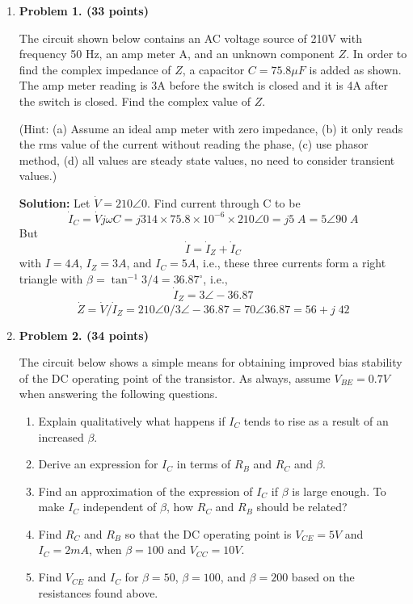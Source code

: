\begin{enumerate}

\item {\bf Problem 1. (33 points)} 

The circuit shown below contains an AC voltage source of 210V with frequency
50 Hz, an amp meter A, and an unknown component $Z$. In order to find the 
complex impedance of $Z$, a capacitor $C=75.8\mu F$ is added as shown. The 
amp meter reading is 3A before the switch is closed and it is 4A after the
switch is closed. Find the complex value of $Z$.

(Hint: (a) Assume an ideal amp meter with zero impedance, (b) it only reads 
the rms value of the current without reading the phase, (c) use phasor method,
(d) all values are steady state values, no need to consider transient values.)


{\bf Solution:}
Let $\dot{V}=210\angle 0$. Find current through C to be
\[ \dot{I}_C=\dot{V} j\omega C=j314\times 75.8\times 10^{-6}\times 210\angle 0
=j5\;A=5\angle 90\;A \]
But
\[ \dot{I}=\dot{I}_Z+\dot{I}_C \]
with $I=4A$, $I_Z=3A$, and $I_C=5A$, i.e., these three currents form a 
right triangle with $\beta=\tan^{-1} 3/4=36.87^\circ$, i.e.,
\[ \dot{I}_Z=3\angle -36.87 \]
\[ \dot{Z}=\dot{V}/\dot{I}_Z=210\angle 0/3\angle -36.87 =70\angle 36.87
=56+j\;42\]



%
%
%

\item {\bf Problem 2. (34 points)} 

The circuit below shows a simple means for obtaining improved bias
stability of the DC operating point of the transistor. As always,
assume $V_{BE}=0.7V$ when answering the following questions.


\begin{enumerate}
\item Explain qualitatively what happens if $I_C$ tends to rise as a
result of an increased $\beta$.
\item Derive an expression for $I_C$ in terms of $R_B$ and $R_C$ and
$\beta$.
\item Find an approximation of the expression of $I_C$ if $\beta$ is 
large enough. To make $I_C$ independent of $\beta$, how $R_C$ and
$R_B$ should be related?
\item Find $R_C$ and $R_B$ so that the DC operating point is $V_{CE}=5V$ 
and $I_C=2mA$, when $\beta=100$ and $V_{CC}=10V$.
\item Find $V_{CE}$ and $I_C$ for $\beta=50$, $\beta=100$, and $\beta=200$
	based on the resistances found above.
\end{enumerate}


\end{enumerate}
